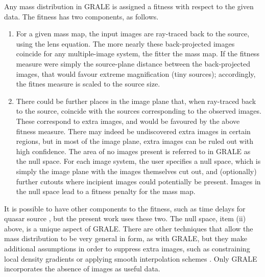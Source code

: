 \documentclass[
  11pt,
  twoside,
  openright,
  titlepage,
  headings=optiontoheadandtoc
]{scrbook}
\begin{document}
Any mass distribution in GRALE is assigned a fitness with respect to the
given data.  The fitness has two components, as follows.

\begin{enumerate}
\item For a given mass map, the input images are ray-traced back to
  the source, using the lens equation.  The more nearly these
  back-projected images coincide for any multiple-image system, the
  fitter the mass map.  If the fitness measure were simply the
  source-plane distance between the back-projected images, that would
  favour extreme magnification (tiny sources); accordingly, the fitnes
  measure is scaled to the source size.
\item There could be further places in the image plane that, when
  ray-traced back to the source, coincide with the sources
  corresponding to the observed images.  These correspond to extra
  images, and would be favoured by the above fitness measure.  There
  may indeed be undiscovered extra images in certain regions, but in
  most of the image plane, extra images can be ruled out with high
  confidence.  The area of no images present is referred to in GRALE
  as the null space.  For each image system, the user specifies a null
  space, which is simply the image plane with the images themselves
  cut out, and (optionally) further cutouts where incipient images
  could potentially be present.  Images in the null space lead to a
  fitness penalty for the mass map.
\end{enumerate}

It is possible to have other components to the fitness, such as time
delays for quasar source \citep{2009MNRAS.397..341L}, but the present
work uses these two.  The null space, item (ii) above, is a unique
aspect of GRALE.  There are other techniques that allow the mass
distribution to be very general in form, as with GRALE, but they make
additional assumptions in order to suppress extra images, such as constraining
local density gradients \citep{2006ApJ...652L...5S} or applying smooth
interpolation schemes \cite{2008ApJ...681..814C}.  Only GRALE
incorporates the absence of images as useful data.
\end{document}
